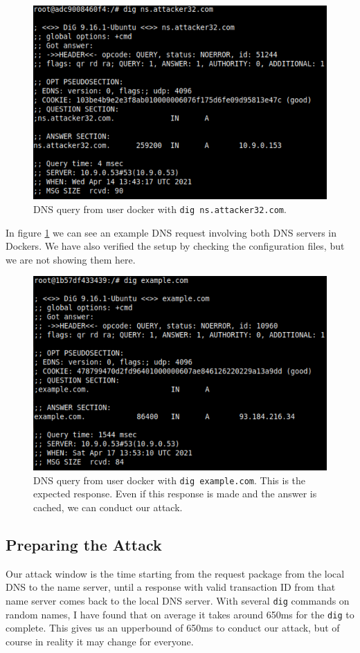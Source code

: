 \documentclass[12pt,reqno]{amsart}
\newcommand{\code}[1]{\texttt{#1}}
\begin{document}
\begin{figure}[h]
\includegraphics[width=0.7\linewidth]{screenshots/user_dig_nsattacker.png}
\caption{DNS query from user docker with \code{dig ns.attacker32.com}.}
\label{fig:atker}
\end{figure}

In figure \ref{fig:atker} we can see an example DNS request involving both DNS servers in Dockers. We have also verified the setup by checking the configuration files, but we are not showing them here.

\begin{figure}[h]
\includegraphics[width=0.7\linewidth]{screenshots/HONEST.png}
\caption{DNS query from user docker with \code{dig example.com}. This is the expected response. Even if this response is made and the answer is cached, we can conduct our attack.}
\label{fig:honest}
\end{figure}

\subsection*{Preparing the Attack}
Our attack window is the time starting from the request package from the local DNS to the name server, until a response with valid transaction ID from that name server comes back to the local DNS server. With several \code{dig} commands on random names, I have found that on average it takes around 650ms for the \code{dig} to complete. This gives us an upperbound of 650ms to conduct our attack, but of course in reality it may change for everyone.
\end{document}
